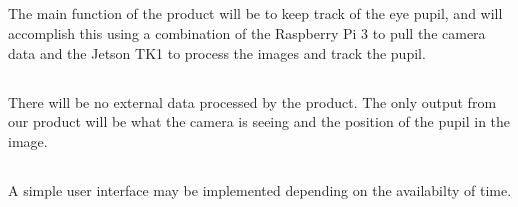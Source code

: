 
\subsection{}
The main function of the product will be to keep track of the eye pupil, and will accomplish this using a combination of the Raspberry Pi 3 to pull the camera data and the Jetson TK1 to process the images and track the pupil. 


\subsection{}
There will be no external data processed by the product.
The only output from our product will be what the camera is seeing and the position of the pupil in the image.

\subsection{}
A simple user interface may be implemented depending on the availabilty of time. 
